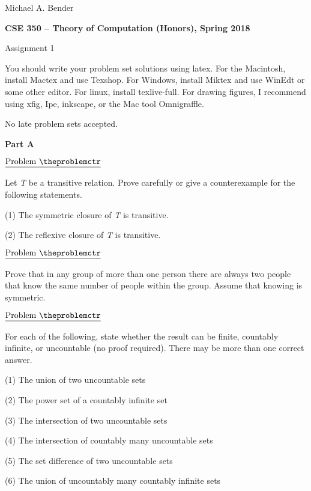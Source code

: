 \documentclass[11pt]{article}
\def\pp{\par\noindent}
\begin{document}
\begin{flushright}

                  Michael A. Bender
\end{flushright}
\centerline{\bf CSE 350 -- Theory of Computation (Honors), Spring 2018}
\medskip
\centerline{Assignment 1}
\bigskip
\bigskip

You should write your problem set solutions using latex. For the Macintosh,
install Mactex and use Texshop. For Windows, install Miktex and use WinEdt or
some other editor. For linux, install texlive-full. For drawing figures, I
recommend using xfig, Ipe, inkscape, or the Mac tool Omnigraffle.

No late problem sets accepted.





\bigskip
{}

\centerline{\bf Part A}



\addtocounter{problemctr}{1}
\bigskip
\noindent
$\underline{\rm Problem\ \theproblemctr}$\pp Let {\em T} be a transitive 
relation. Prove carefully or give a counterexample for the following 
statements.

\noindent
(1) The symmetric closure of {\em T} is transitive.

\noindent
(2) The reflexive closure of {\em T} is transitive.


\addtocounter{problemctr}{1}
\bigskip
\noindent
$\underline{\rm Problem\ \theproblemctr}$\pp Prove that in any group of more
than one person there are always two people that know the same number of people
within the group. Assume that knowing is symmetric.


\addtocounter{problemctr}{1}
\bigskip
\noindent
$\underline{\rm Problem\ \theproblemctr}$\pp For each of the following, state
whether the result can be finite, countably infinite, or uncountable (no proof
required). There may be more than one correct answer.

\noindent
(1) The union of two uncountable sets

\noindent
(2) The power set of a countably infinite set

\noindent
(3) The intersection of two uncountable sets

\noindent
(4) The intersection of countably many uncountable sets

\noindent
(5) The set difference of two uncountable sets

\noindent
(6) The union of uncountably many countably infinite sets
\end{document}
